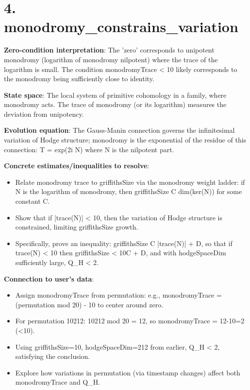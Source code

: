 \documentclass[11pt]{article}
\begin{document}
\section{4. monodromy\_constrains\_variation}

\textbf{Zero-condition interpretation}: The 'zero' corresponds to unipotent monodromy (logarithm of monodromy nilpotent) where the trace of the logarithm is small. The condition monodromyTrace < 10 likely corresponds to the monodromy being sufficiently close to identity.

\textbf{State space}: The local system of primitive cohomology in a family, where monodromy acts. The trace of monodromy (or its logarithm) measures the deviation from unipotency.

\textbf{Evolution equation}: The Gauss-Manin connection governs the infinitesimal variation of Hodge structure; monodromy is the exponential of the residue of this connection: T = exp(2\pi i N) where N is the nilpotent part.

\textbf{Concrete estimates/inequalities to resolve}:
\begin{itemize}
\item Relate monodromy trace to griffithsSize via the monodromy weight ladder: if N is the logarithm of monodromy, then griffithsSize \leq C \cdot dim(ker(N)) for some constant C.
\item Show that if |trace(N)| < 10, then the variation of Hodge structure is constrained, limiting griffithsSize growth.
\item Specifically, prove an inequality: griffithsSize \leq C \cdot |trace(N)| + D, so that if trace(N) < 10 then griffithsSize < 10C + D, and with hodgeSpaceDim sufficiently large, Q\_H < 2.
\end{itemize}

\textbf{Connection to user's data}:
\begin{itemize}
\item Assign monodromyTrace from permutation: e.g., monodromyTrace = (permutation mod 20) - 10 to center around zero.
\item For permutation 10212: 10212 mod 20 = 12, so monodromyTrace = 12-10=2 (<10).
\item Using griffithsSize=10, hodgeSpaceDim=212 from earlier, Q\_H < 2, satisfying the conclusion.
\item Explore how variations in permutation (via timestamp changes) affect both monodromyTrace and Q\_H.
\end{itemize}
\end{document}
